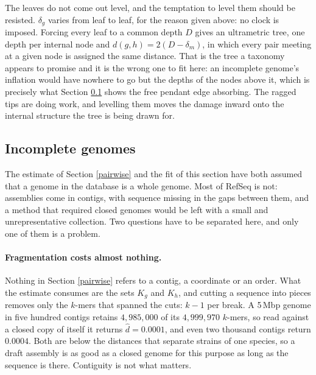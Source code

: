 \documentclass[pdflatex,sn-vancouver-num]{sn-jnl}
\begin{document}
The leaves do not come out level, and the temptation to level them should be resisted. $\delta_g$
varies from leaf to leaf, for the reason given above: no clock is imposed. Forcing every leaf to a common depth $D$ gives an
ultrametric tree, one depth per internal node and $d(g,h) = 2(D - \delta_m)$, in which every pair
meeting at a given node is assigned the same distance. That is the tree a taxonomy appears to promise
and it is the wrong one to fit here: an incomplete genome's inflation would have nowhere to go but
the depths of the nodes above it, which is precisely what Section \ref{incomplete} shows the free
pendant edge absorbing. The ragged tips are doing work, and levelling them moves the damage inward
onto the internal structure the tree is being drawn for.

\subsection{Incomplete genomes}\label{incomplete}

The estimate of Section \ref{pairwise} and the fit of this section have both assumed that a genome in
the database is a whole genome. Most of RefSeq is not:
assemblies come in contigs, with sequence missing in the gaps between them, and a method that
required closed genomes would be left with a small and unrepresentative collection. Two questions
have to be separated here, and only one of them is a problem.

\paragraph{Fragmentation costs almost nothing.} Nothing in Section \ref{pairwise} refers to a contig,
a coordinate or an order. What the estimate consumes are the sets $K_g$ and $K_h$, and cutting a
sequence into pieces removes only the $k$-mers that spanned the cuts: $k-1$ per break. A 5\,Mbp
genome in five hundred contigs retains $4{,}985{,}000$ of its $4{,}999{,}970$ $k$-mers, so read
against a closed copy of itself it returns $\widehat{d} = 0.0001$, and even two thousand contigs
return $0.0004$. Both are below the distances that separate strains of one species, so a draft
assembly is as good as a closed genome for this purpose as long as the sequence is there. Contiguity
is not what matters.
\end{document}
